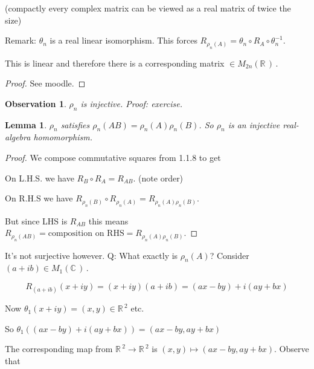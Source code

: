 \documentclass[12pt,a4paper]{article}
\newcommand{\rR}{\ensuremath{\mathbb{R}\,}}
\newcommand{\cC}{\ensuremath{\mathbb{C}\,}}
\newcommand{\mr}[1]{\ensuremath{M_{#1}(\rR)\,}}
\newcommand{\mc}[1]{\ensuremath{M_{#1}(\cC)\,}}
\newtheorem{lemma}[thm]{Lemma}
\newtheorem{obs}[thm]{Observation}
\begin{document}
(compactly every complex matrix can be viewed as a real matrix of twice the size)

Remark: $\theta _n $ is  a real linear isomorphism. This forces $R_{\rho _n (A)}=\theta _n \circ R_A \circ \theta _n^{-1}$.

This is linear and therefore there is a corresponding matrix $\in \mr{2n}$.

\begin{proof}
See moodle.
\end{proof}

\begin{obs}
$\rho_n$ is injective. Proof: exercise.
\end{obs}

\begin{lemma}
$\rho _n$ satisfies $\rho_n(AB)= \rho_n(A)\rho_n(B)$. So $\rho_n$ is  an injective real-algebra homomorphism.
\end{lemma}
\begin{proof}
We compose commutative squares from 1.1.8 to get

\begin{center}
\end{center}

On L.H.S. we have $R_B \circ R_A = R_{AB}$. (note order)

On R.H.S we have $R_{\rho_n(B)} \circ R_{\rho_n(A)} =R_{\rho_n(A)\rho_n(B)}$.

But since LHS is $R_{AB}$ this means $R_{\rho_n(AB)}= \text{composition on RHS}=R_{\rho_n(A)\rho_n(B)}$.
\end{proof}

It's not surjective however. Q: What exactly is $\rho_n(A)$? Consider $(a+ib)\in \mc{1}$. 

\[R_{(a+ib)}(x+iy)=(x+iy)(a+ib)=(ax-by)+i(ay+bx)\]

Now $\theta_1(x+iy)=(x,y) \in \rR^2$ etc.

So $\theta_1((ax-by)+i(ay+bx))=(ax-by,ay+bx)$

The corresponding map from $\rR ^2\to \rR^2$ is $(x,y)\mapsto (ax-by,ay+bx)$. Observe that 
\end{document}
